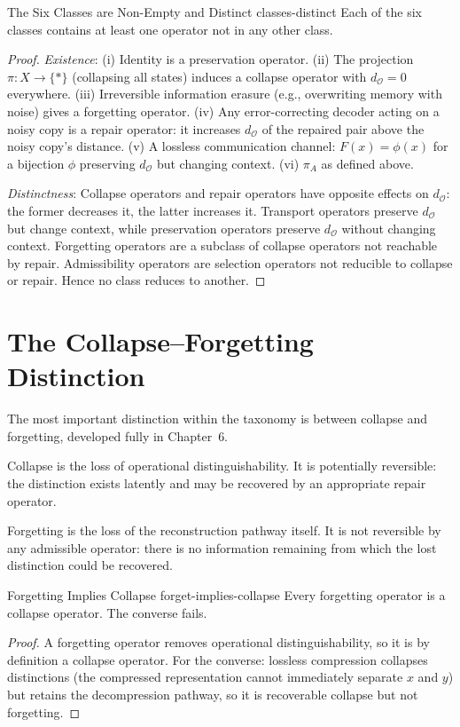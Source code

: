 \documentclass[12pt,twoside,openright]{book}
\newcommand{\distMetric}{d_{\mathcal{O}}}
\begin{document}
\begin{theorem}{The Six Classes are Non-Empty and Distinct}%
  {classes-distinct}
Each of the six classes contains at least one operator not in
any other class.
\begin{proof}
\emph{Existence}:
(i) Identity is a preservation operator.
(ii) The projection $\pi:X\to\{*\}$ (collapsing all states)
  induces a collapse operator with $\distMetric=0$ everywhere.
(iii) Irreversible information erasure (e.g., overwriting memory
  with noise) gives a forgetting operator.
(iv) Any error-correcting decoder acting on a noisy copy is a
  repair operator: it increases $\distMetric$ of the repaired
  pair above the noisy copy's distance.
(v) A lossless communication channel: $F(x)=\phi(x)$ for a
  bijection $\phi$ preserving $\distMetric$ but changing context.
(vi) $\pi_A$ as defined above.

\emph{Distinctness}:
Collapse operators and repair operators have opposite effects
on $\distMetric$: the former decreases it, the latter increases
it. Transport operators preserve $\distMetric$ but change
context, while preservation operators preserve $\distMetric$
without changing context. Forgetting operators are a subclass
of collapse operators not reachable by repair. Admissibility
operators are selection operators not reducible to
collapse or repair. Hence no class reduces to another.
\end{proof}
\end{theorem}

\section{The Collapse--Forgetting Distinction}

The most important distinction within the taxonomy is between
collapse and forgetting, developed fully in Chapter~6.

Collapse is the loss of operational distinguishability. It is
potentially reversible: the distinction exists latently and may
be recovered by an appropriate repair operator.

Forgetting is the loss of the reconstruction pathway itself.
It is not reversible by any admissible operator: there is no
information remaining from which the lost distinction could be
recovered.

\begin{proposition}{Forgetting Implies Collapse}%
  {forget-implies-collapse}
Every forgetting operator is a collapse operator.
The converse fails.
\begin{proof}
A forgetting operator removes operational distinguishability,
so it is by definition a collapse operator. For the
converse: lossless compression collapses distinctions (the
compressed representation cannot immediately separate $x$ and
$y$) but retains the decompression pathway, so it is
recoverable collapse but not forgetting.
\end{proof}
\end{proposition}
\end{document}
